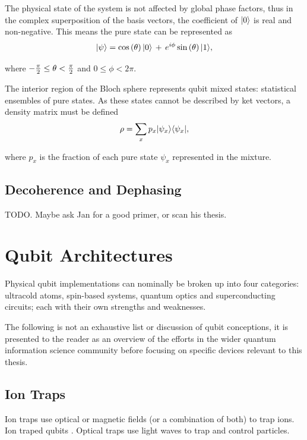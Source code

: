 The physical state of the system is not affected by global phase factors, thus in the complex superposition of the basis vectors, the coefficient of $\lvert0\rangle$ is real and non-negative.
This means the pure state can be represented as
\begin{equation}
\lvert\psi\rangle = \cos\left(\theta\right) \lvert0\rangle \, + \, e^{i \phi}  \sin\left(\theta\right) \lvert1\rangle,
\end{equation}

where $\cramped{-\frac{\pi}{2} \leq \theta < \frac{\pi}{2}}$ and $0 \leq \phi < 2 \pi$.

The interior region of the Bloch sphere represents qubit mixed states: statistical ensembles of pure states.
As these states cannot be described by ket vectors, a density matrix must be defined
\begin{equation}
\rho = \sum_x p_x \lvert\psi_x\rangle \langle\psi_x\rvert,
\end{equation}

where $p_x$ is the fraction of each pure state $\psi_x$ represented in the mixture.

\subsection{Decoherence and Dephasing}
\cite{Makhlin2001, Paladino2014}
TODO. Maybe ask Jan for a good primer, or scan his thesis.


\section{Qubit Architectures}
Physical qubit implementations can nominally be broken up into four categories: ultracold atoms, spin-based systems, quantum optics and superconducting circuits; each with their own strengths and weaknesses.

The following is not an exhaustive list or discussion of qubit conceptions, it is presented to the reader as an overview of the efforts in the wider quantum information science community before focusing on specific devices relevant to this thesis.

\subsection{Ion Traps}
Ion traps\cite{Paul1990}  use optical or magnetic fields (or a combination of both) to trap ions. Ion traped qubits \cite{Cirac1995}.
Optical traps use light waves to trap and control particles.

